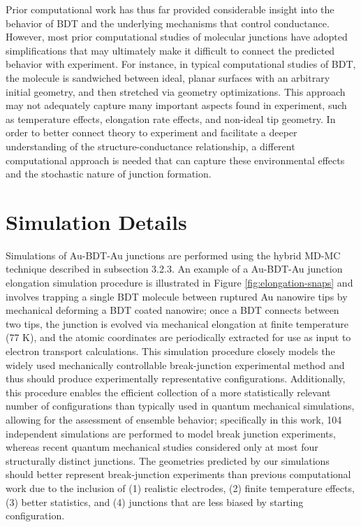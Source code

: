 \documentclass[10pt]{report}  %
\newcommand\findent{\hspace*{\parindent}}
\begin{document}
Prior computational work \cite{Sergueev:2010,Pontes:2011,Strange:2010,Romaner:2006,Andrews:2008,Kim:2010} has thus far provided considerable insight into the behavior of BDT and the underlying mechanisms that control conductance. However, most prior computational studies of molecular junctions have adopted simplifications that may ultimately make it difficult to connect the predicted behavior with experiment. For instance, in typical computational studies of BDT, the molecule is sandwiched between ideal, planar surfaces with an arbitrary initial geometry, and then stretched via geometry optimizations.\cite{Sergueev:2010,Pontes:2011,Romaner:2006} This approach may not adequately capture many important aspects found in experiment, such as temperature effects, elongation rate effects, and non-ideal tip geometry. In order to better connect theory to experiment and facilitate a deeper understanding of the structure-conductance relationship, a different computational approach is needed that can capture these environmental effects and the stochastic nature of junction formation.

\section{Simulation Details}

\findent Simulations of Au-BDT-Au junctions are performed using the hybrid MD-MC technique described in subsection 3.2.3. An example of a Au-BDT-Au junction elongation simulation procedure is illustrated in Figure \ref{fig:elongation-snaps} and involves trapping a single BDT molecule between ruptured Au nanowire tips by mechanical deforming a BDT coated nanowire; once a BDT connects between two tips, the junction is evolved via mechanical elongation at finite temperature (77 K), and the atomic coordinates are periodically extracted for use as input to electron transport calculations. This simulation procedure closely models the widely used mechanically controllable break-junction experimental method \cite{Reed:1997,Kim:2011,Bruot:2012} and thus should produce experimentally representative configurations. Additionally, this procedure enables the efficient collection of a more statistically relevant number of configurations than typically used in quantum mechanical simulations, allowing for the assessment of ensemble behavior; specifically in this work, 104 independent simulations are performed to model break junction experiments, whereas recent quantum mechanical studies \cite{Sergueev:2010,Pontes:2011,Strange:2010,Romaner:2006} considered only at most four structurally distinct junctions. The geometries predicted by our simulations should better represent break-junction experiments than previous computational work \cite{Sergueev:2010,Pontes:2011,Strange:2010,Romaner:2006} due to the inclusion of (1) realistic electrodes, (2) finite temperature effects, (3) better statistics, and (4) junctions that are less biased by starting configuration.
\end{document}
